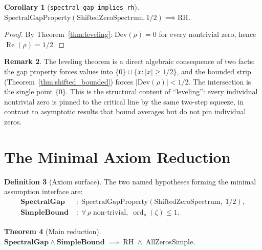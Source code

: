 \documentclass[12pt, a4paper]{article}
\theoremstyle{plain}
\newtheorem{theorem}{Theorem}[section]
\newtheorem{corollary}[theorem]{Corollary}
\theoremstyle{definition}
\newtheorem{definition}[theorem]{Definition}
\newtheorem{remark}[theorem]{Remark}
\newcommand{\re}{\operatorname{Re}}
\newcommand{\zetaord}{\operatorname{ord}}
\newcommand{\lean}[1]{\texttt{#1}}
\newcommand{\RH}{\mathrm{RH}}
\begin{document}
\begin{corollary}[\lean{spectral\_gap\_implies\_rh}]
\label{cor:gap_rh}
$\mathrm{SpectralGapProperty}(\mathrm{ShiftedZeroSpectrum}, 1/2) \implies \RH$.
\end{corollary}

\begin{proof}
By Theorem~\ref{thm:leveling}: $\mathrm{Dev}(\rho) = 0$ for every nontrivial
zero, hence $\re(\rho) = 1/2$.
\end{proof}

\begin{remark}
The leveling theorem is a direct algebraic consequence of two facts:
the gap property forces values into $\{0\} \cup \{x : |x| \geq 1/2\}$,
and the bounded strip (Theorem~\ref{thm:shifted_bounded}) forces
$|\mathrm{Dev}(\rho)| < 1/2$.
The intersection is the single point $\{0\}$.
This is the structural content of ``leveling'': every individual nontrivial
zero is pinned to the critical line by the same two-step squeeze, in
contrast to asymptotic results that bound averages but do not pin individual
zeros.
\end{remark}

\section{The Minimal Axiom Reduction}
\label{sec:minimal}

\begin{definition}[Axiom surface]
\label{def:axioms}
The two named hypotheses forming the minimal assumption interface are:
\begin{align*}
  \mathbf{SpectralGap} &\;:\;
    \mathrm{SpectralGapProperty}(\mathrm{ShiftedZeroSpectrum},\; 1/2), \\
  \mathbf{SimpleBound} &\;:\;
    \forall\, \rho\;\text{non-trivial},\;
    \zetaord_\rho(\zeta) \leq 1.
\end{align*}
\end{definition}

\begin{theorem}[Main reduction]
\label{thm:main}
$\mathbf{SpectralGap} \wedge \mathbf{SimpleBound}
\;\implies\;
\RH \;\wedge\; \mathrm{AllZerosSimple}$.
\end{theorem}
\end{document}
